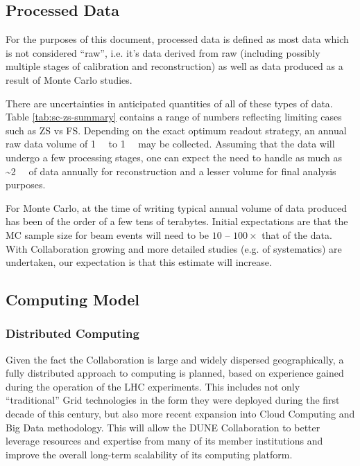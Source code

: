 \subsection{Processed Data}
\label{sec:detectors-sc-infrastructure-processed-data}
For the purposes of this document, processed data is defined as most data which is not considered ``raw'', i.e. it's data derived from raw (including possibly multiple stages
of calibration and reconstruction) as well as data produced as a result of Monte Carlo studies.

There are uncertainties in anticipated quantities of all of these types of data. Table \ref{tab:sc-zs-summary} contains
a range of numbers reflecting limiting cases such as ZS vs FS.
Depending on the exact optimum readout strategy, an annual raw data volume of
\SI{1}{\tera\byte} to \SI{1}{\peta\byte} may be collected.
Assuming that
the data will undergo a few processing stages, one can expect the need
to handle as much as \textasciitilde \SI{2}{\peta\byte} of data annually for reconstruction and a lesser
volume for final analysis purposes.

For Monte Carlo, at the time of writing typical annual volume of data produced has been of the order of a few tens of terabytes.
Initial expectations are that the MC sample size for beam events will
need to be $10$ -- $100\times$ that of the data.
With Collaboration growing
and more detailed studies (e.g. of systematics) are undertaken, our
expectation is that this estimate will increase.

\subsection{Computing Model}
\label{sec:detectors-sc-infrastructure-computing-model}

\subsubsection{Distributed Computing}

Given the fact the Collaboration is large and widely dispersed
geographically, a fully distributed approach to computing is planned,
based on experience gained during the operation of the LHC
experiments. This includes not only ``traditional'' Grid technologies
in the form they were deployed during the first decade of this
century, but also more recent expansion into Cloud Computing and Big
Data methodology. This will allow the DUNE Collaboration to better
leverage resources and expertise from many of its member institutions
and improve the overall long-term scalability of its computing
platform.

